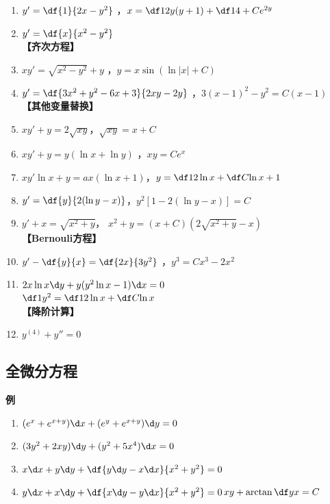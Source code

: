 \hspace{-1ex}{\bf 【上下颠倒】}
\begin{enumerate}[(1)]
  \setlength{\itemindent}{1cm}
  \item $y'=\df{1}{2x-y^2}$ ，$x=\df12y(y+1)+\df14+Ce^{2y}$
  \item $y'=\df{x}{x^2-y^2}$\\
  {\bf 【齐次方程】}
  \item $xy'=\sqrt{x^2-y^2}+y$ ，$y=x\sin(\ln|x|+C)$
  \item $y'=\df{3x^2+y^2-6x+3}{2xy-2y}$
  ，$3(x-1)^2-y^2=C(x-1)$\\
  {\bf 【其他变量替换】}
  \item $xy'+y=2\sqrt{xy}$，$\sqrt{xy}=x+C$
  \item $xy'+y=y(\ln x+\ln y) $ ，$xy=Ce^x$
  \item $xy'\ln x+y=ax(\ln x+1)$，$y=\df12\ln x+\df C{\ln x}+1$
  \item $y'=\df{y}{2(\ln y-x)}$，$y^2[1-2(\ln y-x)]=C$
  \item $y'+x=\sqrt{x^2+y}$，
  $x^2+y=(x+C)(2\sqrt{x^2+y}-x)$\\
  {\bf 【Bernouli方程】}
  \item $y'-\df{y}{x}=\df{2x}{3y^2}$ ，$y^3=Cx^3-2x^2$
  \item $2x\ln x\d y+y(y^2\ln x-1)\d x=0$\\
  \hfill $\df1{y^2}=\df12\ln x+\df C{\ln x}$\\
  {\bf 【降阶计算】}
  \item $y^{(4)}+y''=0$
\end{enumerate}

\subsection{全微分方程}

{\bf 例}
\begin{enumerate}[(1)]
  \setlength{\itemindent}{1cm}
  \item $(e^x+e^{x+y})\d x+(e^y+e^{x+y})\d y=0$
  \item $(3y^2+2xy)\d y+(y^2+5x^4)\d x=0$
  \item $x\d x+y\d y+\df{y\d y-x\d x}{x^2+y^2}=0$
  \item $y\d x+x\d y+\df{x\d y-y\d x}{x^2+y^2}=0$\dotfill$xy+\arctan\df yx=C$ 
\end{enumerate}

